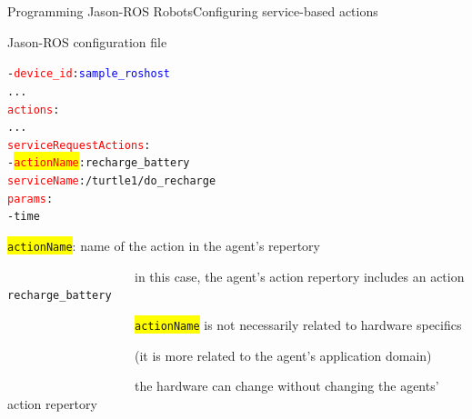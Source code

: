 \documentclass[compress]{beamer}
\newcommand{\yamlkey}[1]{\textcolor{red}{\texttt{#1}}}
\newcommand{\yamlvalue}[1]{\textcolor{blue}{\texttt{#1}}}
\begin{document}
\begin{frame}[fragile]{Programming Jason-ROS Robots}{Configuring service-based actions}{}


\footnotesize

\begin{block}{Jason-ROS configuration file}


\scriptsize
\begin{alltt}\scriptsize
- \yamlkey{device_id}: \yamlvalue{sample_roshost}
     ...
  \yamlkey{actions}:        
        ...
     \yamlkey{serviceRequestActions}:
        - \colorbox{yellow}{\yamlkey{actionName}}: recharge_battery
          \yamlkey{serviceName}: /turtle1/do_recharge
          \yamlkey{params}:
             - time
\end{alltt}
    
\end{block}  

 \colorbox{yellow}{\texttt{actionName}}: name of the action in the agent's repertory\\
 
  \vspace{-.5cm}
 

 
 \ \ \ \ \ \ \ \ \ \ \ \ \ \ \ \ \ \ \ \ {\tiny in this case, the agent's action repertory includes an action \texttt{recharge\_battery}}\\
 
 \vspace{-.5cm}
 
 \ \ \ \ \ \ \ \ \ \ \ \ \ \ \ \ \ \ \ \ {\tiny \colorbox{yellow}{\texttt{actionName}} is not necessarily related to hardware specifics}\\
 
  \vspace{-.5cm}
 
 \ \ \ \ \ \ \ \ \ \ \ \ \ \ \ \ \ \ \ \ {\tiny (it is more related to the agent's application domain)}\\
 
  
  \vspace{-.5cm}
 
 \ \ \ \ \ \ \ \ \ \ \ \ \ \ \ \ \ \ \ \ {\tiny the hardware can change without changing the agents' action repertory}\\
 


\end{frame}
\end{document}
